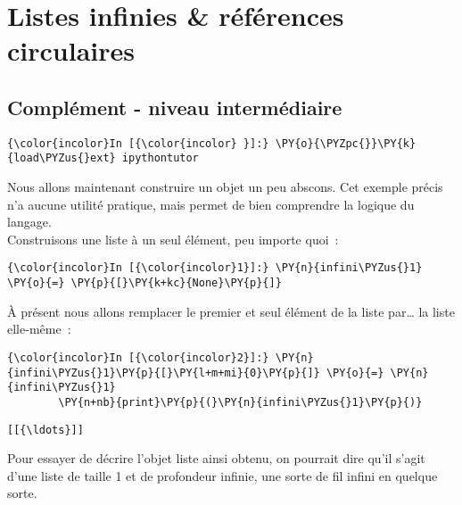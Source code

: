     \hypertarget{listes-infinies-ruxe9fuxe9rences-circulaires}{%
\section{Listes infinies \& références
circulaires}\label{listes-infinies-ruxe9fuxe9rences-circulaires}}

    \hypertarget{compluxe9ment---niveau-intermuxe9diaire}{%
\subsection{Complément - niveau
intermédiaire}\label{compluxe9ment---niveau-intermuxe9diaire}}

    \begin{Verbatim}[commandchars=\\\{\}]
{\color{incolor}In [{\color{incolor} }]:} \PY{o}{\PYZpc{}}\PY{k}{load\PYZus{}ext} ipythontutor
\end{Verbatim}


    Nous allons maintenant construire un objet un peu abscons. Cet exemple
précis n'a aucune utilité pratique, mais permet de bien comprendre la
logique du langage.\\

    Construisons une liste à un seul élément, peu importe quoi~:

    \begin{Verbatim}[commandchars=\\\{\}]
{\color{incolor}In [{\color{incolor}1}]:} \PY{n}{infini\PYZus{}1} \PY{o}{=} \PY{p}{[}\PY{k+kc}{None}\PY{p}{]}
\end{Verbatim}


    À présent nous allons remplacer le premier et seul élément de la liste
par\ldots{} la liste elle-même~:

    \begin{Verbatim}[commandchars=\\\{\}]
{\color{incolor}In [{\color{incolor}2}]:} \PY{n}{infini\PYZus{}1}\PY{p}{[}\PY{l+m+mi}{0}\PY{p}{]} \PY{o}{=} \PY{n}{infini\PYZus{}1}
        \PY{n+nb}{print}\PY{p}{(}\PY{n}{infini\PYZus{}1}\PY{p}{)}
\end{Verbatim}


    \begin{Verbatim}[commandchars=\\\{\}]
[[{\ldots}]]

    \end{Verbatim}

    Pour essayer de décrire l'objet liste ainsi obtenu, on pourrait dire
qu'il s'agit d'une liste de taille 1 et de profondeur infinie, une sorte
de fil infini en quelque sorte.\\

